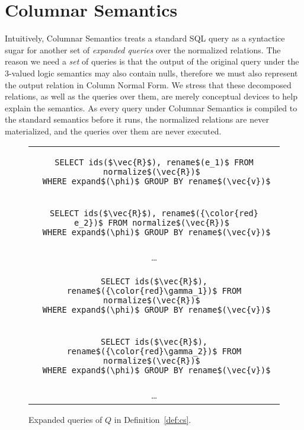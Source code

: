 \documentclass[sigconf]{acmart}
\begin{document}
\section{Columnar Semantics}
\label{sec:cs}

Intuitively, Columnar Semantics treats a standard SQL query 
 as a syntactice sugar for another set of {\em expanded queries}
 over the normalized relations.
The reason we need a {\em set} of queries is that
 the output of the original query under the 3-valued logic semantics may 
 also contain nulls, 
 therefore we must also represent the output relation in Column Normal Form. 
We stress that these decomposed relations,
 as well as the queries over them,
 are merely conceptual devices to help explain the semantics.
As every query under Columnar Semantics 
 is compiled to the standard semantics before it runs,
 the normalized relations are never materialized,
 and the queries over them are never executed.

\begin{figure}
\centering
\begin{tabular}{c}
\begin{lstlisting}
SELECT ids($\vec{R}$), rename$(e_1)$ FROM normalize$(\vec{R})$ 
 WHERE expand$(\phi)$ GROUP BY rename$(\vec{v})$
\end{lstlisting}\\
\begin{lstlisting}[basicstyle=\color{black!40}\ttfamily\small]
SELECT ids($\vec{R}$), rename$({\color{red} e_2})$ FROM normalize$(\vec{R})$ 
 WHERE expand$(\phi)$ GROUP BY rename$(\vec{v})$
\end{lstlisting}\\
\dots\\
\begin{lstlisting}[basicstyle=\color{black!40}\ttfamily\small]
SELECT ids($\vec{R}$), rename$({\color{red}\gamma_1})$ FROM normalize$(\vec{R})$ 
 WHERE expand$(\phi)$ GROUP BY rename$(\vec{v})$
\end{lstlisting}\\
\begin{lstlisting}[basicstyle=\color{black!40}\ttfamily\small]
SELECT ids($\vec{R}$), rename$({\color{red}\gamma_2})$ FROM normalize$(\vec{R})$ 
 WHERE expand$(\phi)$ GROUP BY rename$(\vec{v})$
\end{lstlisting}\\
\dots
\end{tabular}
\caption{Expanded queries of $Q$ in Definition~\ref{def:cs}.}
\label{fig:expanded}
\end{figure}
\end{document}
